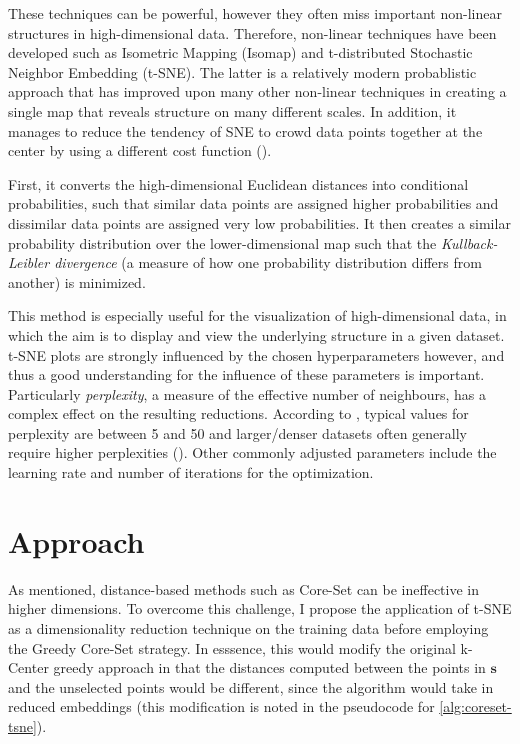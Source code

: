 \documentclass[english,bachelor,ul]{webisthesis} %
\begin{document}
These techniques can be powerful, however they often miss important non-linear structures in high-dimensional data. Therefore, non-linear techniques have been developed such as Isometric Mapping (Isomap) and t-distributed Stochastic Neighbor Embedding (t-SNE). The latter is a relatively modern probablistic approach that has improved upon many other non-linear techniques in creating a single map that reveals structure on many different scales. In addition, it manages to reduce the tendency of SNE to crowd data points together at the center by using a different cost function (\cite{van2008visualizing}). 

First, it converts the high-dimensional Euclidean distances into conditional probabilities, such that similar data points are assigned higher probabilities and dissimilar data points are assigned very low probabilities. It then creates a similar probability distribution over the lower-dimensional map such that the \textit{Kullback-Leibler divergence} (a measure of how one probability distribution differs from another) is minimized.

This method is especially useful for the visualization of high-dimensional data, in which the aim is to display and view the underlying structure in a given dataset. t-SNE plots are strongly influenced by the chosen hyperparameters however, and thus a good understanding for the influence of these parameters is important. Particularly \textit{perplexity}, a measure of the effective number of neighbours, has a complex effect on the resulting reductions. According to \cite{van2008visualizing}, typical values for perplexity are between 5 and 50 and larger/denser datasets often generally require higher perplexities (\cite{vanHomepage}). Other commonly adjusted parameters include the learning rate and number of iterations for the optimization.

\chapter{Approach}

As mentioned, distance-based methods such as Core-Set can be ineffective in higher dimensions. To overcome this challenge, I propose the application of t-SNE as a dimensionality reduction technique on the training data before employing the Greedy Core-Set strategy. In esssence, this would modify the original k-Center greedy approach in that the distances computed between the points in $ \mathbf{s} $ and the unselected points would be different, since the algorithm would take in reduced embeddings (this modification is noted in the pseudocode for \ref{alg:coreset-tsne}).
\end{document}
